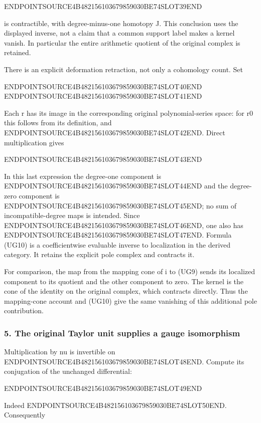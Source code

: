 ENDPOINTSOURCE4B482156103679859030BE74SLOT39END

is contractible, with degree-minus-one homotopy J. This conclusion uses the displayed inverse, not a claim that a common support label makes a kernel vanish. In particular the entire arithmetic quotient of the original complex is retained.

There is an explicit deformation retraction, not only a cohomology count. Set

ENDPOINTSOURCE4B482156103679859030BE74SLOT40END ENDPOINTSOURCE4B482156103679859030BE74SLOT41END

Each r has its image in the corresponding original polynomial-series space: for r0 this follows from its definition, and ENDPOINTSOURCE4B482156103679859030BE74SLOT42END. Direct multiplication gives

ENDPOINTSOURCE4B482156103679859030BE74SLOT43END

In this last expression the degree-one component is ENDPOINTSOURCE4B482156103679859030BE74SLOT44END and the degree-zero component is ENDPOINTSOURCE4B482156103679859030BE74SLOT45END; no sum of incompatible-degree maps is intended. Since ENDPOINTSOURCE4B482156103679859030BE74SLOT46END, one also has ENDPOINTSOURCE4B482156103679859030BE74SLOT47END. Formula (UG10) is a coefficientwise evaluable inverse to localization in the derived category. It retains the explicit pole complex and contracts it.

For comparison, the map from the mapping cone of i to (UG9) sends its localized component to its quotient and the other component to zero. The kernel is the cone of the identity on the original complex, which contracts directly. Thus the mapping-cone account and (UG10) give the same vanishing of this additional pole contribution.

\subsubsection{5. The original Taylor unit supplies a gauge isomorphism}\label{endpoint-f1_unit_gauge--the-original-taylor-unit-supplies-a-gauge-isomorphism}

Multiplication by nu is invertible on ENDPOINTSOURCE4B482156103679859030BE74SLOT48END. Compute its conjugation of the unchanged differential:

ENDPOINTSOURCE4B482156103679859030BE74SLOT49END

Indeed ENDPOINTSOURCE4B482156103679859030BE74SLOT50END. Consequently

